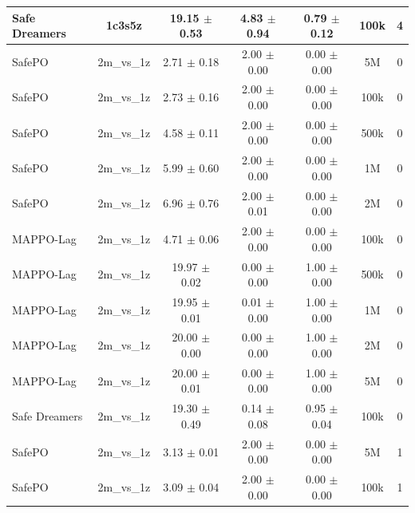 \documentclass{article}
\begin{document}
\begin{longtable}{lcccccc}
Safe Dreamers & 1c3s5z & 19.15 $\pm$ 0.53 & 4.83 $\pm$ 0.94 & 0.79 $\pm$ 0.12 & 100k & 4 \\
\midrule
SafePO & 2m\_vs\_1z & \textcolor{green!60!black}{2.71 $\pm$ 0.18} & \textcolor{green!60!black}{2.00 $\pm$ 0.00} & \textcolor{green!60!black}{0.00 $\pm$ 0.00} & 5M & 0 \\
SafePO & 2m\_vs\_1z & \textcolor{green!60!black}{2.73 $\pm$ 0.16} & \textcolor{green!60!black}{2.00 $\pm$ 0.00} & \textcolor{green!60!black}{0.00 $\pm$ 0.00} & 100k & 0 \\
SafePO & 2m\_vs\_1z & \textcolor{green!60!black}{4.58 $\pm$ 0.11} & \textcolor{green!60!black}{2.00 $\pm$ 0.00} & \textcolor{green!60!black}{0.00 $\pm$ 0.00} & 500k & 0 \\
SafePO & 2m\_vs\_1z & \textcolor{green!60!black}{5.99 $\pm$ 0.60} & \textcolor{green!60!black}{2.00 $\pm$ 0.00} & \textcolor{green!60!black}{0.00 $\pm$ 0.00} & 1M & 0 \\
SafePO & 2m\_vs\_1z & \textcolor{green!60!black}{6.96 $\pm$ 0.76} & \textcolor{green!60!black}{2.00 $\pm$ 0.01} & \textcolor{green!60!black}{0.00 $\pm$ 0.00} & 2M & 0 \\
MAPPO-Lag & 2m\_vs\_1z & \textcolor{green!60!black}{4.71 $\pm$ 0.06} & \textcolor{green!60!black}{2.00 $\pm$ 0.00} & \textcolor{green!60!black}{0.00 $\pm$ 0.00} & 100k & 0 \\
MAPPO-Lag & 2m\_vs\_1z & \textcolor{red!70!black}{19.97 $\pm$ 0.02} & \textcolor{red!70!black}{0.00 $\pm$ 0.00} & \textcolor{red!70!black}{1.00 $\pm$ 0.00} & 500k & 0 \\
MAPPO-Lag & 2m\_vs\_1z & \textcolor{red!70!black}{19.95 $\pm$ 0.01} & \textcolor{red!70!black}{0.01 $\pm$ 0.00} & \textcolor{red!70!black}{1.00 $\pm$ 0.00} & 1M & 0 \\
MAPPO-Lag & 2m\_vs\_1z & \textcolor{red!70!black}{2\textcolor{red!70!black}{0.00 $\pm$ 0.00}} & 0.00 $\pm$ 0.00 & \textcolor{red!70!black}{1.00 $\pm$ 0.00} & 2M & 0 \\
MAPPO-Lag & 2m\_vs\_1z & \textcolor{red!70!black}{20.00 $\pm$ 0.01} & \textcolor{red!70!black}{0.00 $\pm$ 0.00} & \textcolor{red!70!black}{1.00 $\pm$ 0.00} & 5M & 0 \\
Safe Dreamers & 2m\_vs\_1z & 19.30 $\pm$ 0.49 & 0.14 $\pm$ 0.08 & 0.95 $\pm$ 0.04 & 100k & 0 \\
\midrule
SafePO & 2m\_vs\_1z & \textcolor{green!60!black}{3.13 $\pm$ 0.01} & \textcolor{green!60!black}{2.00 $\pm$ 0.00} & \textcolor{green!60!black}{0.00 $\pm$ 0.00} & 5M & 1 \\
SafePO & 2m\_vs\_1z & \textcolor{green!60!black}{3.09 $\pm$ 0.04} & \textcolor{green!60!black}{2.00 $\pm$ 0.00} & \textcolor{green!60!black}{0.00 $\pm$ 0.00} & 100k & 1 \\

\end{longtable}
\end{document}
